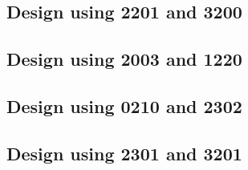 \subsection{Design using 2201 and 3200}


 \begin{center}




 \end{center}



\subsection{Design using 2003 and 1220}


 \begin{center}




 \end{center}



\subsection{Design using 0210 and 2302}


 \begin{center}




 \end{center}



\subsection{Design using 2301 and 3201}

